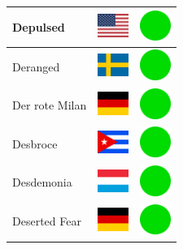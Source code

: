 \documentclass[12pt, a4paper, twoside]{report}
\begin{document}
\begin{center}
\begin{longtable}{|p{5cm}|p{2cm}|p{2cm}|}
Depulsed & \includegraphics[width=1cm]{4x3/us} & \includegraphics[width=1cm]{likes/y} \\ \hline
Deranged & \includegraphics[width=1cm]{4x3/se} & \includegraphics[width=1cm]{likes/y} \\ \hline
Der rote Milan & \includegraphics[width=1cm]{4x3/de} & \includegraphics[width=1cm]{likes/y} \\ \hline
Desbroce & \includegraphics[width=1cm]{4x3/cu} & \includegraphics[width=1cm]{likes/y} \\ \hline
Desdemonia & \includegraphics[width=1cm]{4x3/lu} & \includegraphics[width=1cm]{likes/y} \\ \hline
Deserted Fear & \includegraphics[width=1cm]{4x3/de} & \includegraphics[width=1cm]{likes/y} \\ \hline

\end{longtable}
\end{center}
\end{document}
